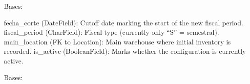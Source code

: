 \documentclass[a4paper,11pt,spanish]{sphinxmanual}
\begin{document}

\begin{fulllineitems}
\label{\detokenize{api/inventory/inventory.models:inventory.models.InventoryConfig}}
\pysigstartsignatures
\pysiglinewithargsret
{}
{\sphinxparamcomma {}}
{}
\pysigstopsignatures
\sphinxAtStartPar
Bases: 
\begin{description}
\sphinxAtStartPar
fecha\_corte (DateField): Cutoff date marking the start of the new fiscal period.
fiscal\_period (CharField): Fiscal type (currently only “S” = semestral).
main\_location (FK to Location): Main warehouse where initial inventory is recorded.
is\_active (BooleanField): Marks whether the configuration is currently active.

\end{description}

\begin{fulllineitems}
\label{\detokenize{api/inventory/inventory.models:inventory.models.InventoryConfig.DoesNotExist}}
\pysigstartsignatures
\pysigline
{}
\pysigstopsignatures
\sphinxAtStartPar
Bases: 

\end{fulllineitems}


\begin{fulllineitems}
\label{\detokenize{api/inventory/inventory.models:inventory.models.InventoryConfig.FISCAL_PERIOD_CHOICES}}
\pysigstartsignatures
\pysigline
{}
\pysigstopsignatures
\end{fulllineitems}


\end{fulllineitems}
\end{document}
